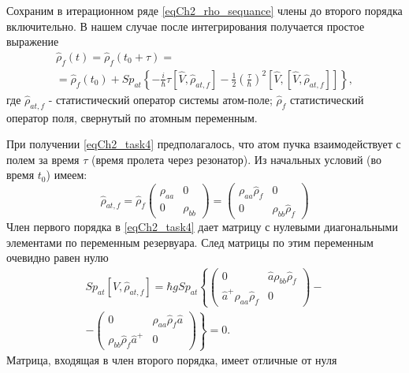 Сохраним в итерационном ряде \eqref{eqCh2_rho_sequance} члены до
второго порядка включительно. В нашем случае после интегрирования
получается простое выражение  
\begin{eqnarray}
\hat{\rho}_{f}\left(t\right) =
\hat{\rho}_{f}\left(t_0 + \tau\right) = 
\nonumber \\
= \hat{\rho}_{f}\left(t_0\right) +
Sp_{at}
\left\{
- \frac{i}{\hbar}\tau\left[\hat{V}, \hat{\rho}_{at, f}\right]
- \frac{1}{2} \left(\frac{\tau}{\hbar}\right)^2
\left[\hat{V},\left[\hat{V}, \hat{\rho}_{at, f}
\right]\right]
\right\}, 
\label{eqCh2_task4}
\end{eqnarray}
где $\hat{\rho}_{at, f}$ -  статистический оператор системы атом-поле;
$\hat{\rho}_{f}$ статистический оператор поля, свернутый по
атомным переменным.
  
При получении \eqref{eqCh2_task4} предполагалось, что атом пучка
взаимодействует с полем за время $\tau$ (время пролета через
резонатор). Из начальных условий (во время $t_0$) имеем:  
\begin{equation}
\hat{\rho}_{at, f} = \hat{\rho}_{f}
\left(
\begin{array} {cc}
\rho_{aa} & 0  
\\
0 & \rho_{bb} 
\end{array}
\right) = 
\left(
\begin{array} {cc}
\rho_{aa}\hat{\rho}_{f} & 0  
\\
0 & \rho_{bb}\hat{\rho}_{f}
\end{array}
\right)
\end{equation}
Член первого порядка в \eqref{eqCh2_task4} дает матрицу с нулевыми
диагональными элементами по переменным резервуара. След матрицы по
этим переменным очевидно равен нулю  
\begin{eqnarray}
Sp_{at}\left[\hat{V}, \hat{\rho}_{at, f}\right] = 
\hbar g Sp_{at}
\left\{
\left(
\begin{array} {cc}
0 & \hat{a} \rho_{bb}\hat{\rho}_{f}  
\\
\hat{a}^{+} \rho_{aa}\hat{\rho}_{f}   & 0
\end{array}
\right)
\right.
-
\nonumber \\
-
\left.
\left(
\begin{array} {cc}
0 & \rho_{aa} \hat{\rho}_{f} \hat{a}   
\\
\rho_{bb} \hat{\rho}_{f} \hat{a}^{+}   & 0
\end{array}
\right)
\right\}
= 0.
\label{eqCh2_sp_1}
\end{eqnarray}
Матрица, входящая в член второго порядка, имеет отличные от нуля
